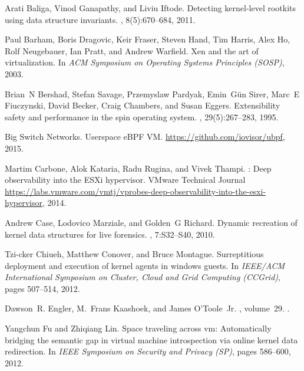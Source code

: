 \documentclass[11pt]{article}
\begin{document}
\begin{thebibliography}{10}
\begin{small}
  Arati Baliga, Vinod Ganapathy, and Liviu Iftode.
  \newblock Detecting kernel-level rootkits using data structure invariants.
  ,
    8(5):670--684, 2011.
  
  Paul Barham, Boris Dragovic, Keir Fraser, Steven Hand, Tim Harris, Alex Ho,
    Rolf Neugebauer, Ian Pratt, and Andrew Warfield.
  \newblock Xen and the art of virtualization.
  \newblock In {\em ACM Symposium on Operating Systems Principles (SOSP)}, 2003.
  
  Brian~N Bershad, Stefan Savage, Przemyslaw Pardyak, Emin~G{\"u}n Sirer, Marc~E
    Fiuczynski, David Becker, Craig Chambers, and Susan Eggers.
  \newblock Extensibility safety and performance in the spin operating system.
  , 29(5):267--283,
    1995.
  
  {Big Switch Networks}.
  \newblock Userspace {eBPF} {VM}.
  \newblock \url{https://github.com/iovisor/ubpf}, 2015.
  
  Martim Carbone, Alok Kataria, Radu Rugina, and Vivek Thampi.
  : Deep observability into the {ESXi} hypervisor.
  \newblock VMware Technical Journal
    \url{https://labs.vmware.com/vmtj/vprobes-deep-observability-into-the-esxi-hypervisor},
    2014.
  
  Andrew Case, Lodovico Marziale, and Golden~G Richard.
  \newblock Dynamic recreation of kernel data structures for live forensics.
  , 7:S32--S40, 2010.
  
  Tzi-cker Chiueh, Matthew Conover, and Bruce Montague.
  \newblock Surreptitious deployment and execution of kernel agents in windows
    guests.
  \newblock In {\em IEEE/ACM International Symposium on Cluster, Cloud and Grid
    Computing (CCGrid)}, pages 507--514, 2012.
  
  Dawson~R. Engler, M.~Frans Kaashoek, and James O'Toole~Jr.
  , volume~29.
  .
  
  Yangchun Fu and Zhiqiang Lin.
  \newblock Space traveling across vm: Automatically bridging the semantic gap in
    virtual machine introspection via online kernel data redirection.
  \newblock In {\em IEEE Symposium on Security and Privacy (SP)}, pages 586--600,
    2012.
  

\end{small}
\end{thebibliography}
\end{document}
